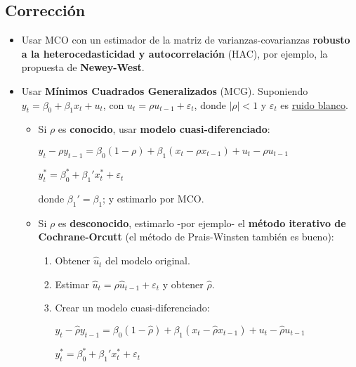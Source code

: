 \documentclass[10pt, a4paper, landscape]{article}
\begin{document}
\begin{multicols}{3}
		\subsection*{Corrección}
		
		\begin{itemize}[leftmargin=*]
			\item Usar MCO con un estimador de la matriz de varianzas-covarianzas \textbf{robusto a la heterocedasticidad y autocorrelación} (HAC), por ejemplo, la propuesta de \textbf{Newey-West}.
			\item Usar \textbf{Mínimos Cuadrados Generalizados} (MCG). Suponiendo $y_{t} = \beta_{0} + \beta_{1} x_{t} + u_{t}$, con $u_{t} = \rho u_{t - 1}+ \varepsilon_{t}$, donde $\lvert \rho \rvert < 1$ y $\varepsilon_{t}$ es \underline{ruido blanco}.
			
			\begin{itemize}[leftmargin=*]
				\item Si $\rho$ es \textbf{conocido}, usar \textbf{modelo cuasi-diferenciado}:
			
				\begin{center}
					$y_{t} - \rho y_{t - 1}= \beta_{0} (1 - \rho) + \beta_{1} (x_{t} - \rho x_{t - 1}) + u_{t} - \rho u_{t - 1}$
					
					$y_{t}^{*} = \beta_{0}^{*} + \beta_{1}' x_{t}^{*} + \varepsilon_{t}$
				\end{center}
				
				donde $\beta_{1}' = \beta_{1}$; y estimarlo por MCO.
				
				\item Si $\rho$ es \textbf{desconocido}, estimarlo -por ejemplo- el \textbf{método iterativo de Cochrane-Orcutt} (el método de Prais-Winsten también es bueno):
				
				\begin{enumerate}[leftmargin=*]
					\item Obtener $\hat{u}_{t}$ del modelo original.
					\item Estimar $\hat{u}_{t} = \rho \hat{u}_{t-1} + \varepsilon_{t}$ y obtener $\hat{\rho}$.
					\item Crear un modelo cuasi-diferenciado:
					
					\begin{center}
						$y_{t} - \hat{\rho}y_{t - 1} = \beta_{0} (1 - \hat{\rho}) + \beta_{1} (x_{t} - \hat{\rho} x_{t - 1}) + u_{t} - \hat{\rho}u_{t - 1}$
						
						$y_{t}^{*} = \beta_{0}^{*} + \beta_{1}' x_{t}^{*} + \varepsilon_{t}$
					\end{center}
					

\end{enumerate}
\end{itemize}
\end{itemize}
\end{multicols}
\end{document}
